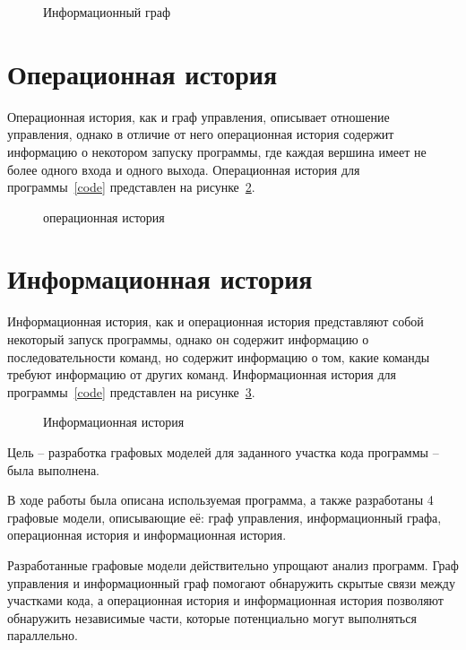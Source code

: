 \begin{figure}[H]
	\centering
	
	
	\caption{Информационный граф}
	\label{fig:IG}
\end{figure}

\section{Операционная история}

Операционная история, как и граф управления, описывает отношение управления, однако в отличие от него операционная история содержит информацию о некотором запуску программы, где каждая вершина имеет не более одного входа и одного выхода. Операционная история для программы~\ref{code} представлен на рисунке~\ref{fig:OH}.

\begin{figure}[H]
	\centering
	
	
	\caption{операционная история}
	\label{fig:OH}
\end{figure}

\section{Информационная история}

Информационная история, как и операционная история представляют собой некоторый запуск программы, однако он содержит информацию о последовательности команд, но содержит информацию о том, какие команды требуют информацию от других команд. Информационная история для программы~\ref{code} представлен на рисунке~\ref{fig:IH}.

\begin{figure}[H]
	\centering
	
	
	\caption{Информационная история}
	\label{fig:IH}
\end{figure}

\clearpage


Цель -- разработка графовых моделей для заданного участка кода программы -- была выполнена.

В ходе работы была описана используемая программа, а также разработаны 4 графовые модели, описывающие её: граф управления, информационный графа, операционная история и информационная история.


Разработанные графовые модели действительно упрощают анализ программ. Граф управления и информационный граф помогают обнаружить скрытые связи между участками кода, а операционная история и информационная история позволяют обнаружить независимые части, которые потенциально могут выполняться параллельно.







